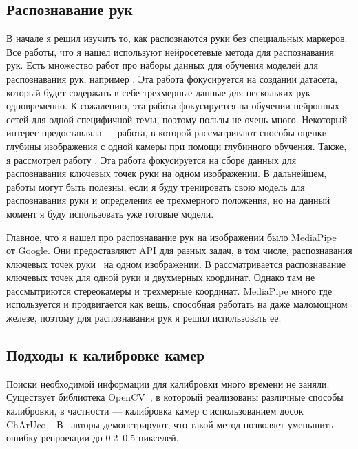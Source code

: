 \documentclass[12pt, a4paper]{article}
\begin{document}
  

\subsection{Распознавание рук}
  В начале я решил изучить то, как распознаются руки без специальных маркеров.
  Все работы, что я нашел используют нейросетевые метода для распознавания рук.
  Есть множество работ про наборы данных для обучения моделей для распознавания
  рук, например \cite{interhand}. Эта работа фокусируется на создании датасета,
  который будет содержать в себе трехмерные данные для нескольких рук
  одновременно. К сожалению, эта работа фокусируется на обучении нейронных
  сетей для одной специфичной темы, поэтому пользы не очень много. Некоторый
  интерес предоставляла \cite{dl-depth-estimation} ---  работа, в которой
  рассматривают способы оценки глубины изображения с одной камеры при помощи
  глубинного обучения. Также, я рассмотрел работу
  \cite{multiviewbootstrapping}. Эта работа фокусируется на сборе данных для
  распознавания ключевых точек руки на одном изображении. В дальнейшем, работы
  \cite{interhand, multiviewbootstrapping} могут быть полезны, если я буду
  тренировать свою модель для распознавания руки и определения ее трехмерного
  положения, но на данный момент я буду использовать уже готовые модели.


  Главное, что я нашел про распознавание рук на изображении было
  MediaPipe~\cite{mediapipe_paper} от Google. Они предоставляют API для разных
  задач, в том числе, распознавания ключевых точек руки~\cite{mediapipe_hands}
  на одном изображении. В \cite{mediapipe_hands} рассматривается распознавание
  ключевых точек для одной руки и двухмерных координат. Однако там не
  рассмытриются стереокамеры и трехмерные координат. MediaPipe много где
  используется и продвигается как вещь, способная работать на даже маломощном
  железе, поэтому для распознавания рук я решил использовать ее.
    
\subsection{Подходы к калибровке камер}
Поиски необходимой информации для калибровки много времени не заняли.
Существует библиотека OpenCV~\cite{opencv}, в котороый реализованы различные
способы калибровки, в частности --- калибровка камер с использованием досок
ChArUco~\cite{opencv_charuco}. В~\cite{opencv_charuco} авторы демонстрируют,
что такой метод позволяет уменьшить ошибку репроекции до 0.2--0.5 пикселей.
\end{document}
